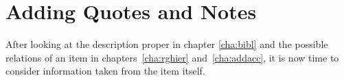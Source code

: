 
\chapter{Adding Quotes and Notes}
\label{cha:quotes}

After looking at the description proper in chapter \ref{cha:bibl} and
the possible relations of an item in chapters~\ref{cha:rghier}
and~\ref{cha:addacc}, it is now time to consider information taken
from the item itself. 




